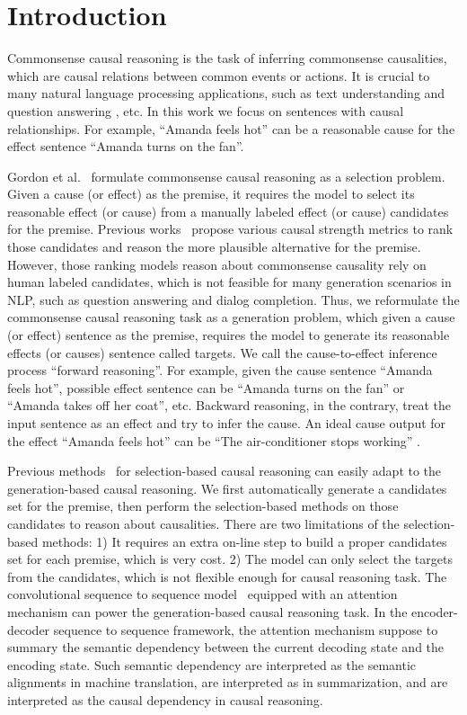\section{Introduction}
Commonsense causal reasoning is the task of inferring commonsense causalities, which are causal relations
between common events or actions. 
It is crucial to many natural language processing applications, such as text understanding and question answering , etc.
In this work we focus on sentences with causal relationships. For example, ``Amanda feels hot'' can be a reasonable cause for the effect sentence ``Amanda turns on the fan''. 

Gordon et al.~\cite{} formulate commonsense causal reasoning as a selection problem.
Given a cause (or effect) as the premise, 
it requires the model to select its reasonable effect (or cause) 
from a manually labeled effect (or cause) candidates for the premise.
Previous works~\cite{} propose various causal strength metrics to rank those candidates and reason the more plausible alternative for the premise.
However, those ranking models reason about commonsense causality rely on human labeled candidates, which is not feasible for many generation scenarios in NLP, such as question answering and dialog completion.
Thus, we reformulate the commonsense causal reasoning task as a generation problem, which given a cause (or effect) sentence as the premise, requires the model to generate its reasonable effects (or causes) sentence called targets. We call the cause-to-effect inference process ``forward reasoning''. For example, given the cause sentence ``Amanda feels hot'', possible effect sentence can be ``Amanda turns on the fan'' or ``Amanda takes off her coat'', etc. Backward reasoning, in the contrary, treat the input sentence as an effect and try to infer the cause. An ideal cause output for the effect ``Amanda feels hot'' can be ``The air-conditioner stops working'' .

Previous methods~\cite{} for selection-based causal reasoning can easily adapt to the generation-based causal reasoning.
We first automatically generate a candidates set for the premise, then perform the selection-based methods on those candidates to reason about causalities.
There are two limitations of the selection-based methods: 1) It requires an extra on-line step to build a proper candidates set for each premise, which is very cost. 2) The model can only select the targets from the candidates, which is not flexible enough for causal reasoning task.
The convolutional sequence to sequence model~\cite{} equipped with an attention mechanism can power the generation-based causal reasoning task.
In the encoder-decoder sequence to sequence framework, the attention mechanism suppose to summary the semantic dependency between the current decoding state and the encoding state. 
Such semantic dependency are interpreted as
the semantic alignments in machine translation,
are interpreted as  in summarization, 
and are interpreted as the causal dependency in causal reasoning.

